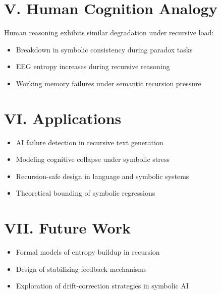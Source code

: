 \documentclass[12pt]{article}
\begin{document}
\section*{V. Human Cognition Analogy}

Human reasoning exhibits similar degradation under recursive load:
\begin{itemize}
  \item Breakdown in symbolic consistency during paradox tasks
  \item EEG entropy increases during recursive reasoning
  \item Working memory failures under semantic recursion pressure
\end{itemize}

\section*{VI. Applications}

\begin{itemize}
  \item AI failure detection in recursive text generation
  \item Modeling cognitive collapse under symbolic stress
  \item Recursion-safe design in language and symbolic systems
  \item Theoretical bounding of symbolic regressions
\end{itemize}

\section*{VII. Future Work}

\begin{itemize}
  \item Formal models of entropy buildup in recursion
  \item Design of stabilizing feedback mechanisms
  \item Exploration of drift-correction strategies in symbolic AI
\end{itemize}
\end{document}
